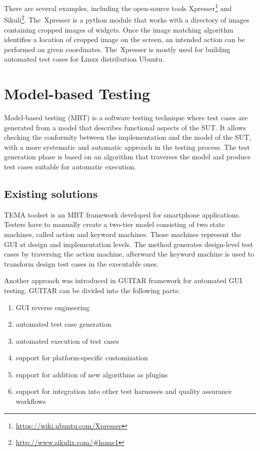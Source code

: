 There are several examples, including the open-source tools Xpresser\footnote{\url{https://wiki.ubuntu.com/Xpresser}} and Sikuli\footnote{\url{http://www.sikulix.com/\#home1}}. The~Xpresser is a python module that works with a directory of images containing cropped images of widgets. Once the image matching algorithm identifies a location of cropped image on the screen, an intended action can be performed on given coordinates.\cite{xpresser} The~Xpresser is mostly used for building automated test cases for Linux distribution Ubuntu.

\newpage
\section{Model-based Testing}
Model-based testing (MBT) is a software testing technique where test cases are generated from a model that describes functional aspects of the SUT. It allows checking the conformity between the implementation and the model of the SUT, with a more systematic and automatic approach in the testing process. The test generation phase is based on an algorithm that traverses the model and produce test cases suitable for automatic execution.\cite{embedded}

\subsection{Existing solutions}\label{TEMA_TOOLSET}
TEMA toolset is an MBT framework developed for smartphone applications. Testers have to manually create a two-tier model consisting of two state machines, called action and keyword machines. Those machines represent the GUI at design and implementation levels. The method generates design-level test cases by traversing the action machine, afterward the keyword machine is used to transform design test cases in the executable ones.\cite{TEMA}

Another approach was introduced in GUITAR\cite{NguyenBao2014Gait} framework for automated GUI testing. GUITAR can be divided into the following parts:
\begin{enumerate}
    \item GUI reverse engineering
    \item automated test case generation
    \item automated execution of test cases
    \item support for platform-specific customization
    \item support for addition of new algorithms as plugins
    \item support for integration into other test harnesses and quality assurance workflows
\end{enumerate}

